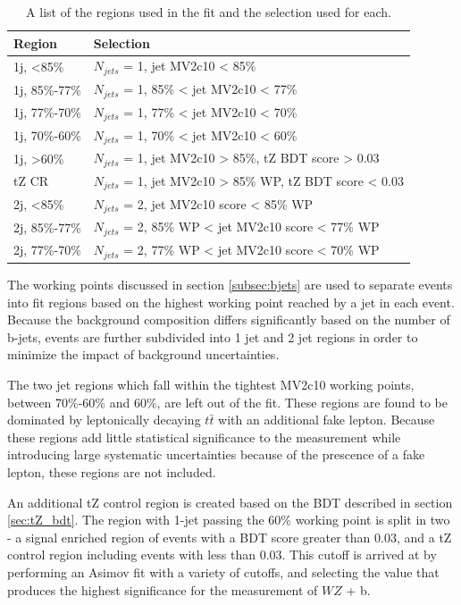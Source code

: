 \documentclass[NOTE, atlasdraft=true, texlive=2016, UKenglish]{\ATLASLATEXPATH atlasdoc}
\begin{document}
\begin{table}[h]
\centering
\caption{A list of the regions used in the fit and the selection used for each.}
\begin{tabular}{l|l}
\hline\hline
Region & Selection  	      \\
\hline
\hline
1j, <85\%	& $N_{jets}$ = 1, jet MV2c10 < 85\%		      \\
1j, 85\%-77\%	& $N_{jets}$ = 1, 85\% < jet MV2c10 < 77\% 		      \\
1j, 77\%-70\%	& $N_{jets}$ = 1, 77\% < jet MV2c10 < 70\% 		      \\
1j, 70\%-60\%	& $N_{jets}$ = 1, 70\% < jet MV2c10 < 60\% 		      \\
1j, >60\%	& $N_{jets}$ = 1, jet MV2c10 > 85\%, tZ BDT score > 0.03 \\
tZ CR	& $N_{jets}$ = 1, jet MV2c10 > 85\% WP, tZ BDT score < 0.03 \\
2j, <85\%	& $N_{jets}$ = 2, jet MV2c10 score < 85\% WP		      \\
2j, 85\%-77\%	& $N_{jets}$ = 2, 85\% WP < jet MV2c10 score < 77\% WP		      \\
2j, 77\%-70\%	& $N_{jets}$ = 2, 77\% WP < jet MV2c10 score < 70\% WP		      \\
\hline\hline
\end{tabular}
\label{tab:regions}
\end{table}

The working points discussed in section \ref{subsec:bjets} are used to separate events into fit regions based on the highest working point reached by a jet in each event. Because the background composition differs significantly based on the number of b-jets, events are further subdivided into 1 jet and 2 jet regions in order to minimize the impact of background uncertainties. 

The two jet regions which fall within the tightest MV2c10 working points, between 70\%-60\% and 60\%, are left out of the fit. These regions are found to be dominated by leptonically decaying $t\bar{t}$ with an additional fake lepton. Because these regions add little statistical significance to the measurement while introducing large systematic uncertainties because of the prescence of a fake lepton, these regions are not included.

An additional tZ control region is created based on the BDT described in section \ref{sec:tZ_bdt}. The region with 1-jet passing the 60\% working point is split in two - a signal enriched region of events with a BDT score greater than 0.03, and a tZ control region including events with less than 0.03. This cutoff is arrived at by performing an Asimov fit with a variety of cutoffs, and selecting the value that produces the highest significance for the measurement of $WZ$ + b. 
\end{document}
